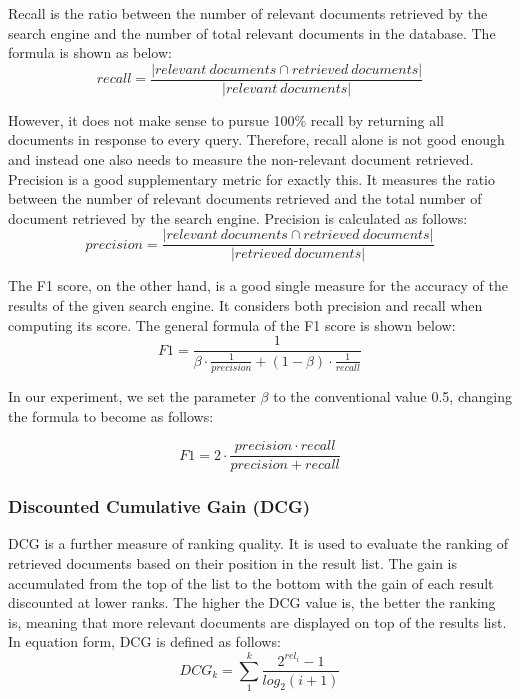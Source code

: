 Recall is the ratio between the number of relevant documents retrieved by the search engine and the number of total relevant documents in the database. The formula is shown as below:
\[recall=\frac{|relevant\ documents\cap retrieved\ documents|}{|relevant\ documents|}\]

However, it does not make sense to pursue 100\% recall by returning all documents in response to every query. Therefore, recall alone is not good enough and instead one also needs to measure the non-relevant document retrieved. Precision is a good supplementary metric for exactly this. It measures the ratio between the number of relevant documents retrieved and the total number of document retrieved by the search engine. Precision is calculated as follows:
\[precision=\frac{|relevant\ documents\cap retrieved\ documents|}{| retrieved\ documents |}\]

The F1 score, on the other hand, is a good single measure for the accuracy of the results of the given search engine. It considers both precision and recall when computing its score. The general formula of the F1 score is shown below:
\[F1=\frac{1}{\beta \cdot \frac{1}{precision}+(1-\beta)\cdot \frac{1}{recall}}\]

In our experiment, we set the parameter $\beta$ to the conventional value 0.5, changing the formula to become as follows:

\[F1=2\cdot \frac{precision \cdot recall}{precision+recall}\]

\subsubsection{Discounted Cumulative Gain (DCG)}

DCG is a further measure of ranking quality. It is used to evaluate the ranking of retrieved documents based on their position in the result list. The gain is accumulated from the top of the list to the bottom with the gain of each result discounted at lower ranks. The higher the DCG value is, the better the ranking is, meaning that more relevant documents are displayed on top of the results list. In equation form, DCG is defined as follows:
\[DCG_{k}=\sum_1^k \frac{2^{rel_{i}}-1}{log_{2}(i+1)}\]


